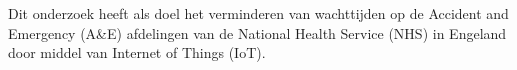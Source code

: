 





Dit onderzoek heeft als doel het verminderen van wachttijden op de Accident and Emergency (A\&E) afdelingen van de National Health Service (NHS) in Engeland door middel van Internet of Things (IoT).


